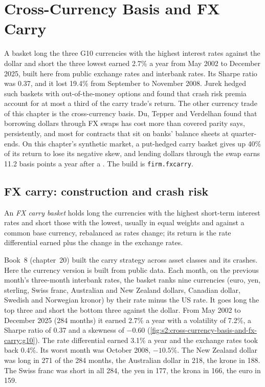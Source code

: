 \chapter{Cross-Currency Basis and FX Carry}\label{ch:s2:cross-currency-basis-and-fx-carry}

A basket long the three G10 currencies with the highest interest rates against the dollar and short the three lowest earned 2.7\% a year from May
2002 to December 2025, built here from public exchange rates and interbank rates. Its Sharpe ratio was 0.37, and it lost 19.4\% from September to
November 2008. Jurek hedged such baskets with out-of-the-money options and found that crash risk premia account for at most a third of the carry trade's
return. The other currency trade of this chapter is the cross-currency basis. Du, Tepper and Verdelhan found that borrowing dollars through FX swaps
has cost more than covered parity says, persistently, and most for contracts that sit on banks' balance sheets at quarter-ends. On this chapter's
synthetic market, a put-hedged carry basket gives up 40\% of its return to lose its negative skew, and lending dollars through the swap earns 11.2
basis points a year after a . The build is \texttt{firm.fxcarry}.

\section{FX carry: construction and crash risk}

\begin{definition}\label{def:s2:cross-currency-basis-and-fx-carry:basket}
An \emph{FX carry basket} holds long the currencies with the highest short-term interest rates and short those with the lowest,
usually in equal weights and against a common base currency, rebalanced as rates change; its return is the rate differential earned plus the change
in the exchange rates.
\end{definition}

Book~8 (chapter~20) built the carry strategy across asset classes and its crashes. Here the currency version is built from public data. Each month,
on the previous month's three-month interbank rates, the basket ranks nine currencies (euro, yen, sterling, Swiss franc, Australian and New Zealand
dollars, Canadian dollar, Swedish and Norwegian kronor) by their rate minus the US rate. It goes long the top three and short the bottom three against
the dollar. From May 2002 to December 2025 (284 months) it earned 2.7\% a year with a volatility of 7.2\%, a Sharpe ratio of 0.37 and a skewness of
$-0.60$ (\cref{fig:s2:cross-currency-basis-and-fx-carry:g10}). The rate differential earned 3.1\% a year and the exchange rates took back 0.4\%. Its
worst month was October 2008, $-10.5\%$. The New Zealand dollar was long in 271 of the 284 months, the Australian dollar in 218, the krone in 188. The
Swiss franc was short in all 284, the yen in 177, the krona in 166, the euro in 159.

